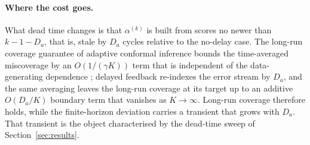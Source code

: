 \paragraph{Where the cost goes.}
What dead time changes is that $\alpha^{(k)}$ is built from scores no newer than $k-1-D_a$, that
is, stale by $D_a$ cycles relative to the no-delay case. The long-run coverage guarantee of
adaptive conformal inference bounds the time-averaged miscoverage by an $O(1/(\gamma K))$ term
that is independent of the data-generating dependence \citep{gibbs2021}; delayed feedback
re-indexes the error stream by $D_a$, and the same averaging leaves the long-run coverage at its
target up to an additive $O(D_a/K)$ boundary term that vanishes as $K\to\infty$. Long-run
coverage therefore holds, while the finite-horizon deviation carries a transient that grows with
$D_a$. That transient is the object characterised by the dead-time sweep of
Section~\ref{sec:results}.
